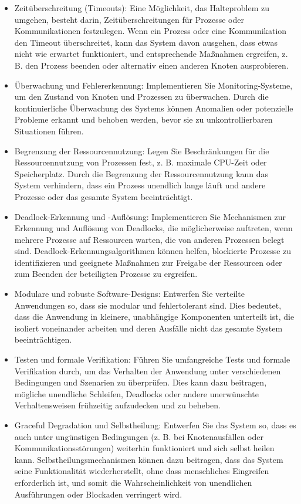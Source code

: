 \begin{itemize}
\item Zeitüberschreitung (Timeouts): Eine Möglichkeit, das Halteproblem zu umgehen, besteht darin, Zeitüberschreitungen für Prozesse oder Kommunikationen festzulegen. Wenn ein Prozess oder eine Kommunikation den Timeout überschreitet, kann das System davon ausgehen, dass etwas nicht wie erwartet funktioniert, und entsprechende Maßnahmen ergreifen, z. B. den Prozess beenden oder alternativ einen anderen Knoten ausprobieren.
\item Überwachung und Fehlererkennung: Implementieren Sie Monitoring-Systeme, um den Zustand von Knoten und Prozessen zu überwachen. Durch die kontinuierliche Überwachung des Systems können Anomalien oder potenzielle Probleme erkannt und behoben werden, bevor sie zu unkontrollierbaren Situationen führen.
\item Begrenzung der Ressourcennutzung: Legen Sie Beschränkungen für die Ressourcennutzung von Prozessen fest, z. B. maximale CPU-Zeit oder Speicherplatz. Durch die Begrenzung der Ressourcennutzung kann das System verhindern, dass ein Prozess unendlich lange läuft und andere Prozesse oder das gesamte System beeinträchtigt.
\item Deadlock-Erkennung und -Auflösung: Implementieren Sie Mechanismen zur Erkennung und Auflösung von Deadlocks, die möglicherweise auftreten, wenn mehrere Prozesse auf Ressourcen warten, die von anderen Prozessen belegt sind. Deadlock-Erkennungsalgorithmen können helfen, blockierte Prozesse zu identifizieren und geeignete Maßnahmen zur Freigabe der Ressourcen oder zum Beenden der beteiligten Prozesse zu ergreifen.
\item Modulare und robuste Software-Designs: Entwerfen Sie verteilte Anwendungen so, dass sie modular und fehlertolerant sind. Dies bedeutet, dass die Anwendung in kleinere, unabhängige Komponenten unterteilt ist, die isoliert voneinander arbeiten und deren Ausfälle nicht das gesamte System beeinträchtigen.
\item Testen und formale Verifikation: Führen Sie umfangreiche Tests und formale Verifikation durch, um das Verhalten der Anwendung unter verschiedenen Bedingungen und Szenarien zu überprüfen. Dies kann dazu beitragen, mögliche unendliche Schleifen, Deadlocks oder andere unerwünschte Verhaltensweisen frühzeitig aufzudecken und zu beheben.
\item Graceful Degradation und Selbstheilung: Entwerfen Sie das System so, dass es auch unter ungünstigen Bedingungen (z. B. bei Knotenausfällen oder Kommunikationsstörungen) weiterhin funktioniert und sich selbst heilen kann. Selbstheilungsmechanismen können dazu beitragen, dass das System seine Funktionalität wiederherstellt, ohne dass menschliches Eingreifen erforderlich ist, und somit die Wahrscheinlichkeit von unendlichen Ausführungen oder Blockaden verringert wird.
\end{itemize}
